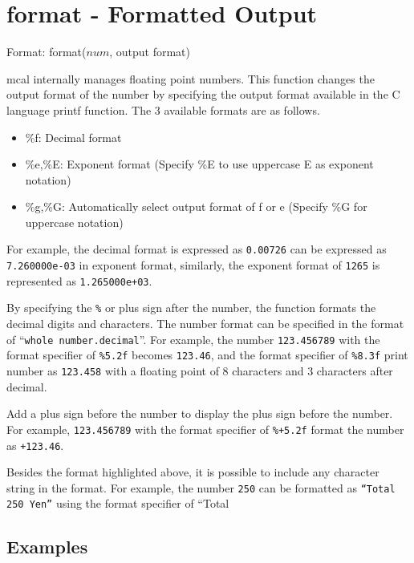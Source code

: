
%

\section{format - Formatted Output\label{sect:format}}

Format: format($num$, output format)

mcal internally manages floating point numbers. This function changes the output format of the number by specifying the output format available in the C language printf function. The 3 available formats are as follows. 

\begin{itemize}
\item \%f: Decimal format
\item \%e,\%E: Exponent format (Specify \%E to use uppercase E as exponent notation)
\item \%g,\%G: Automatically select output format of f or e (Specify \%G for uppercase notation)
\end{itemize}

For example, the decimal format is expressed as \verb|0.00726| can be expressed as \verb|7.260000e-03| in exponent format, similarly, the exponent format of \verb|1265| is represented as \verb|1.265000e+03|. 

By specifying the \verb|%| or plus sign after the number, the function formats the decimal digits and characters. The number format can be specified in the format of “\verb|whole number.decimal|”. For example, the number \verb|123.456789| with the format specifier of \verb|%5.2f| becomes \verb|123.46|, and the format specifier of \verb|%8.3f| print number as \verb|123.458| with a floating point of 8 characters and 3 characters after decimal. 

Add a plus sign before the number to display the plus sign before the number. For example, \verb|123.456789| with the format specifier of \verb|%+5.2f| format the number as \verb|+123.46|. 

Besides the format highlighted above, it is possible to include any character string in the format. For example, the number \verb|250| can be formatted as \verb|“Total 250 Yen”| using the format specifier of “Total %



\subsection*{Examples}


%

